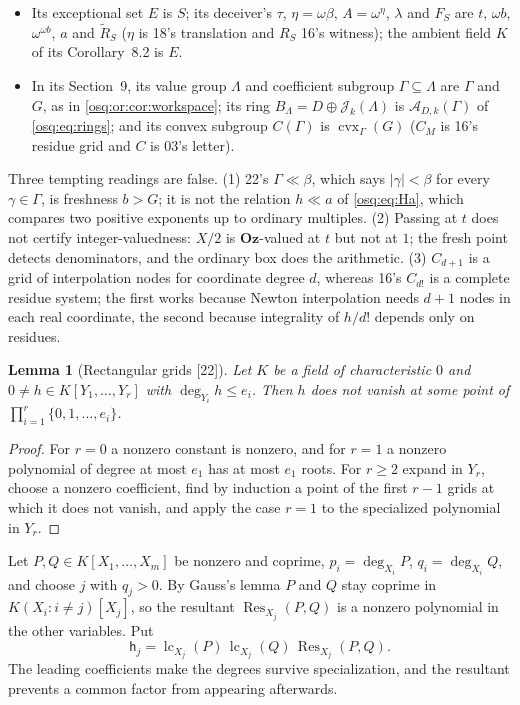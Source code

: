 \documentclass[11pt,letterpaper]{article}
\numberwithin{equation}{section}
\newtheorem{lemma}[lemma]{Lemma}
\theoremstyle{definition}
\theoremstyle{remark}
\theoremstyle{plain}
\newcommand{\Oz}{\mathbf{Oz}}
\newcommand{\A}{\mathcal A}          %
\newcommand{\lc}{\operatorname{lc}}
\newcommand{\src}[1]{\textup{\textsf{[#1]}}}
\begin{document}
\begin{itemize}
$C_{d+1}$ in the notation of \cref{osq:fs:prop:gausstest}.
\item Its exceptional set $E$ is $S$; its deceiver's $\tau$, $\eta=\omega\beta$, $A=\omega^\eta$, $\lambda$ and $F_S$ are $t$, $\omega b$, $\omega^{\omega b}$,
$a$ and $\widetilde R_S$ ($\eta$ is 18's translation and $R_S$ 16's witness); the ambient field $K$ of its Corollary~8.2 is $E$.
\item In its Section~9, its value group $\Lambda$ and coefficient subgroup $\Gamma\subseteq\Lambda$ are $\Gamma$ and $G$, as in \cref{osq:or:cor:workspace}; its
ring $B_\Lambda=D\oplus\mathcal J_k(\Lambda)$ is $\A_{D,k}(\Gamma)$ of \eqref{osq:eq:rings}; and its convex subgroup $C(\Gamma)$ is $\operatorname{cvx}_\Gamma(G)$
($C_M$ is 16's residue grid and $C$ is 03's letter).
\end{itemize}
Three tempting readings are false. (1) 22's $\Gamma\ll\beta$, which says $|\gamma|<\beta$ for every $\gamma\in\Gamma$, is freshness $b>G$; it is not the
relation $h\ll a$ of \eqref{osq:eq:Ha}, which compares two positive exponents up to ordinary multiples. (2) Passing at $t$ does not certify
integer-valuedness: $X/2$ is $\Oz$-valued at $t$ but not at $1$; the fresh point detects denominators, and the ordinary box does the arithmetic.
(3) $C_{d+1}$ is a grid of interpolation nodes for coordinate degree $d$, whereas 16's $C_{d!}$ is a complete residue system; the first works because
Newton interpolation needs $d+1$ nodes in each real coordinate, the second because integrality of $h/d!$ depends only on residues.

\begin{lemma}[Rectangular grids \src{22}]\label{osq:ft:lem:grid}
Let $K$ be a field of characteristic $0$ and $0\ne h\in K[Y_1,\dots,Y_r]$ with $\deg_{Y_i}h\le e_i$. Then $h$ does not vanish at some point of
$\prod_{i=1}^r\{0,1,\dots,e_i\}$.
\end{lemma}
\begin{proof}
For $r=0$ a nonzero constant is nonzero, and for $r=1$ a nonzero polynomial of degree at most $e_1$ has at most $e_1$ roots. For $r\ge2$ expand in $Y_r$,
choose a nonzero coefficient, find by induction a point of the first $r-1$ grids at which it does not vanish, and apply the case $r=1$ to the specialized
polynomial in $Y_r$.
\end{proof}

Let $P,Q\in K[X_1,\dots,X_m]$ be nonzero and coprime, $p_i=\deg_{X_i}P$, $q_i=\deg_{X_i}Q$, and choose $j$ with $q_j>0$. By Gauss's lemma $P$ and $Q$ stay
coprime in $K(X_i:i\ne j)[X_j]$, so the resultant $\operatorname{Res}_{X_j}(P,Q)$ is a nonzero polynomial in the other variables. Put
\begin{equation}\label{osq:ft:eq:badpoly}
 \mathsf h_j=\lc_{X_j}(P)\,\lc_{X_j}(Q)\,\operatorname{Res}_{X_j}(P,Q).
\end{equation}
The leading coefficients make the degrees survive specialization, and the resultant prevents a common factor from appearing afterwards.
\end{document}
